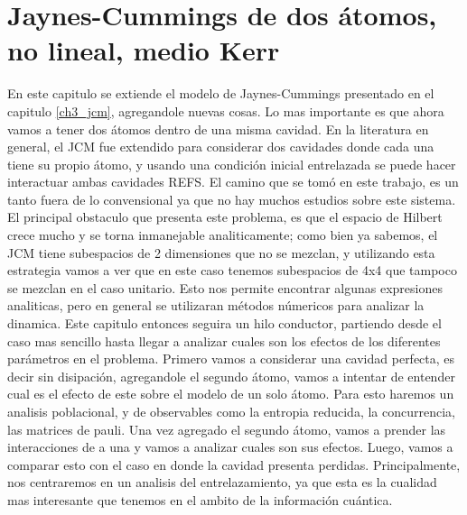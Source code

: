 \chapter{Jaynes-Cummings de dos átomos, no lineal, medio Kerr}
\label{ch4_dinamica}

\pagestyle{fancy}
\fancyhf{}
\fancyhead[LE]{\nouppercase{\rightmark\hfill}}
\fancyhead[RO]{\nouppercase{\leftmark\hfill}}
\fancyfoot[LE,RO]{\hfill\thepage\hfill}

En este capitulo se extiende el modelo de Jaynes-Cummings presentado en el capitulo \ref{ch3_jcm}, agregandole nuevas cosas. Lo mas importante es que ahora vamos a tener dos átomos dentro de una misma cavidad. En la literatura en general, el JCM fue extendido para considerar dos cavidades donde cada una tiene su propio átomo, y usando una condición inicial entrelazada se puede hacer interactuar ambas cavidades REFS. El camino que se tomó en este trabajo, es un tanto fuera de lo convensional ya que no hay muchos estudios sobre este sistema. El principal obstaculo que presenta este problema, es que el espacio de Hilbert crece mucho y se torna inmanejable analiticamente; como bien ya sabemos, el JCM tiene subespacios de 2 dimensiones que no se mezclan, y utilizando esta estrategia vamos a ver que en este caso tenemos subespacios de 4x4 que tampoco se mezclan en el caso unitario. Esto nos permite encontrar algunas expresiones analiticas, pero en general se utilizaran métodos númericos para analizar la dinamica. \newline
Este capitulo entonces seguira un hilo conductor, partiendo desde el caso mas sencillo hasta llegar a analizar cuales son los efectos de los diferentes parámetros en el problema. 
	Primero vamos a considerar una cavidad perfecta, es decir sin disipaci\'on, agregandole el segundo átomo, vamos a intentar de entender cual es el efecto de este sobre el modelo de un solo átomo. Para esto haremos un analisis poblacional, y de observables como la entropia reducida, la concurrencia, las matrices de pauli. Una vez agregado el segundo átomo, vamos a prender las interacciones de a una y vamos a analizar cuales son sus efectos. Luego, vamos a comparar esto con el caso en donde la cavidad presenta perdidas. Principalmente, nos centraremos en un analisis del entrelazamiento, ya que esta es la cualidad mas interesante que tenemos en el ambito de la informaci\'on cu\'antica. 

